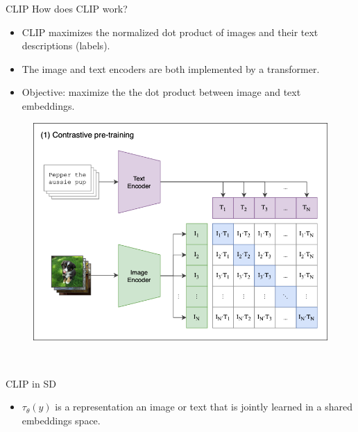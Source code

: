 \documentclass[8pt]{beamer}
\begin{document}
\begin{frame}{CLIP}
    How does CLIP work?
    \begin{itemize}
        \item CLIP maximizes the normalized dot product of images and their text descriptions (labels).
        \item The image and text encoders are both implemented by a transformer.
        \item Objective: maximize the the dot product between image and text embeddings.
    \end{itemize}
   \begin{figure}
       \centering
       \includegraphics[scale=.16]{images/clip_model_architecture}
       \label{fig:unet_text_condition}
   \end{figure}~\cite{clip}
\end{frame}



\begin{frame}{CLIP in SD}
    \begin{itemize}
        \item $\tau_{\theta}(y)$ is a representation an image or text that is jointly learned in a shared embeddings space.
    \end{itemize}
\end{frame}
\end{document}
